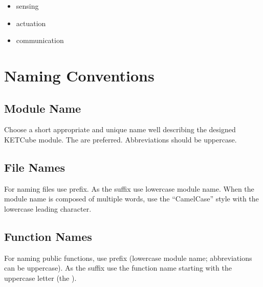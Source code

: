 \begin{itemize}
  \item sensing
  \item actuation
  \item communication
\end{itemize}


\setcounter{tocdepth}{1}
\tableofcontents
\clearpage

\listoffigures
\listoftables
\begin{versionhistory}
\end{versionhistory}
\setcounter{table}{0}

\clearpage 
{} 
\pagestyle{headings} 

\clearpage
\section{Naming Conventions}
\subsection*{Module Name}
Choose a short appropriate and unique name well describing the designed KETCube module. The  are preferred. Abbreviations should be uppercase.

\subsection*{File Names}
For naming files use  prefix. As the suffix use lowercase module name. When the module name is composed of multiple words, use the ``CamelCase'' style with the lowercase leading character.


\subsection*{Function Names}
For naming public functions, use  prefix (lowercase module name; abbreviations can be uppercase). As the suffix use the function name starting with the uppercase letter (the ).


